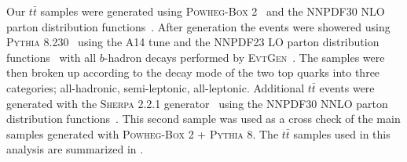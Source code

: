 Our $t\bar{t}$ samples were generated using \textsc{Powheg-Box}
2~\cite{Campbell2012} and the NNPDF30 NLO parton distribution
functions~\cite{Ball:2014uwa}. After generation the events were showered using
\textsc{Pythia} 8.230~\cite{Sjostrand:2014zea} using the A14 tune and the
NNPDF23 LO parton distribution functions~\cite{Carrazza:2013axa} with all
$b$-hadron decays performed by \textsc{EvtGen}~\cite{LANGE2001152}.  The
samples were then broken up according to the decay mode of the two top quarks
into three categories; all-hadronic, semi-leptonic, all-leptonic. Additional
$t\bar{t}$ events were generated with the \textsc{Sherpa} 2.2.1
generator~\cite{Gleisberg:2008ta} using the NNPDF30 NNLO parton distribution
functions~\cite{Ball:2014uwa}.  This second sample was used as a cross check of
the main samples generated with \textsc{Powheg-Box} 2 + \textsc{Pythia} 8. The
$t\bar{t}$ samples used in this analysis are summarized in
.

